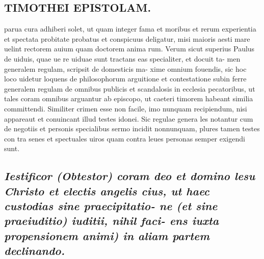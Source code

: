 \documentclass{article}
\begin{document}
\begin{pages}
\section*{TIMOTHEI EPISTOLAM. }
\marginpar{[ p.145 ]}\pstart parua cura adhiberi solet, ut quam integer fama et moribus et rerum experientia et spectata probitate probatus et conspicuus deligatur, misi maioris aesti mare uelint rectorem auium quam doctorem anima rum. Verum sicut superius Paulus de uiduis, quae ue re uiduae sunt tractans eas specialiter, et docuit ta- men generalem regulam, scripsit de domesticis ma- xime omnium fouendis, sic hoc loco uidetur loquens de philosophorum arguitione et contestatione subin ferre generalem regulam de omnibus publicis et scandalosis in ecclesia pecatoribus, ut tales coram omnibus arguantur ab episcopo, ut caeteri timorem habeant similia committendi. Similiter crimen esse non facile, imo nunquam recipiendum, nisi appareaut et conuincant illud testes idonei. Sic regulae genera les notantur cum de negotiis et personis specialibus sermo incidit nonnunquam, plures tamen testes con tra senes et spectuales uiros quam contra leues personas semper exigendi sunt.  \pend
{}
{}
\subsection*{\textit{Iestificor (Obtestor) coram deo et domino lesu Christo et electis angelis cius, ut haec custodias sine praecipitatio- ne (et sine praeiuditio) iuditii, nihil faci- ens iuxta propensionem animi) in aliam partem declinando. }}

\end{pages}
\end{document}
